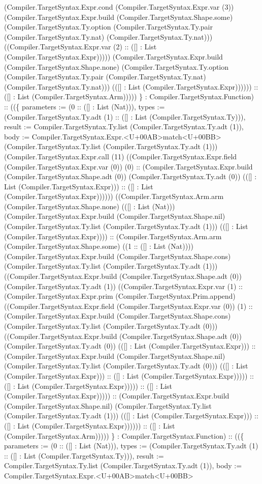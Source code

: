 \documentclass[11pt]{article}
\begin{document}
(Compiler.TargetSyntax.Expr.cond (Compiler.TargetSyntax.Expr.var (3)) (Compiler.TargetSyntax.Expr.build (Compiler.TargetSyntax.Shape.some) (Compiler.TargetSyntax.Ty.option (Compiler.TargetSyntax.Ty.pair (Compiler.TargetSyntax.Ty.nat) (Compiler.TargetSyntax.Ty.nat))) ((Compiler.TargetSyntax.Expr.var (2) :: ([] : List (Compiler.TargetSyntax.Expr))))) (Compiler.TargetSyntax.Expr.build (Compiler.TargetSyntax.Shape.none) (Compiler.TargetSyntax.Ty.option (Compiler.TargetSyntax.Ty.pair (Compiler.TargetSyntax.Ty.nat) (Compiler.TargetSyntax.Ty.nat))) (([] : List (Compiler.TargetSyntax.Expr)))))) :: ([] : List (Compiler.TargetSyntax.Arm))))) \} : Compiler.TargetSyntax.Function) :: ((\{ parameters := (0 :: ([] : List (Nat))), types := (Compiler.TargetSyntax.Ty.adt (1) :: ([] : List (Compiler.TargetSyntax.Ty))), result := Compiler.TargetSyntax.Ty.list (Compiler.TargetSyntax.Ty.adt (1)), body := Compiler.TargetSyntax.Expr.<U+00AB>match<U+00BB> (Compiler.TargetSyntax.Ty.list (Compiler.TargetSyntax.Ty.adt (1))) (Compiler.TargetSyntax.Expr.call (11) ((Compiler.TargetSyntax.Expr.field (Compiler.TargetSyntax.Expr.var (0)) (0) :: (Compiler.TargetSyntax.Expr.build (Compiler.TargetSyntax.Shape.adt (0)) (Compiler.TargetSyntax.Ty.adt (0)) (([] : List (Compiler.TargetSyntax.Expr))) :: ([] : List (Compiler.TargetSyntax.Expr)))))) ((Compiler.TargetSyntax.Arm.arm (Compiler.TargetSyntax.Shape.none) (([] : List (Nat))) (Compiler.TargetSyntax.Expr.build (Compiler.TargetSyntax.Shape.nil) (Compiler.TargetSyntax.Ty.list (Compiler.TargetSyntax.Ty.adt (1))) (([] : List (Compiler.TargetSyntax.Expr)))) :: (Compiler.TargetSyntax.Arm.arm (Compiler.TargetSyntax.Shape.some) ((1 :: ([] : List (Nat)))) (Compiler.TargetSyntax.Expr.build (Compiler.TargetSyntax.Shape.cons) (Compiler.TargetSyntax.Ty.list (Compiler.TargetSyntax.Ty.adt (1))) ((Compiler.TargetSyntax.Expr.build (Compiler.TargetSyntax.Shape.adt (0)) (Compiler.TargetSyntax.Ty.adt (1)) ((Compiler.TargetSyntax.Expr.var (1) :: (Compiler.TargetSyntax.Expr.prim (Compiler.TargetSyntax.Prim.append) ((Compiler.TargetSyntax.Expr.field (Compiler.TargetSyntax.Expr.var (0)) (1) :: (Compiler.TargetSyntax.Expr.build (Compiler.TargetSyntax.Shape.cons) (Compiler.TargetSyntax.Ty.list (Compiler.TargetSyntax.Ty.adt (0))) ((Compiler.TargetSyntax.Expr.build (Compiler.TargetSyntax.Shape.adt (0)) (Compiler.TargetSyntax.Ty.adt (0)) (([] : List (Compiler.TargetSyntax.Expr))) :: (Compiler.TargetSyntax.Expr.build (Compiler.TargetSyntax.Shape.nil) (Compiler.TargetSyntax.Ty.list (Compiler.TargetSyntax.Ty.adt (0))) (([] : List (Compiler.TargetSyntax.Expr))) :: ([] : List (Compiler.TargetSyntax.Expr))))) :: ([] : List (Compiler.TargetSyntax.Expr))))) :: ([] : List (Compiler.TargetSyntax.Expr))))) :: (Compiler.TargetSyntax.Expr.build (Compiler.TargetSyntax.Shape.nil) (Compiler.TargetSyntax.Ty.list (Compiler.TargetSyntax.Ty.adt (1))) (([] : List (Compiler.TargetSyntax.Expr))) :: ([] : List (Compiler.TargetSyntax.Expr)))))) :: ([] : List (Compiler.TargetSyntax.Arm))))) \} : Compiler.TargetSyntax.Function) :: ((\{ parameters := (0 :: ([] : List (Nat))), types := (Compiler.TargetSyntax.Ty.adt (1) :: ([] : List (Compiler.TargetSyntax.Ty))), result := Compiler.TargetSyntax.Ty.list (Compiler.TargetSyntax.Ty.adt (1)), body := Compiler.TargetSyntax.Expr.<U+00AB>match<U+00BB> 
\end{document}
